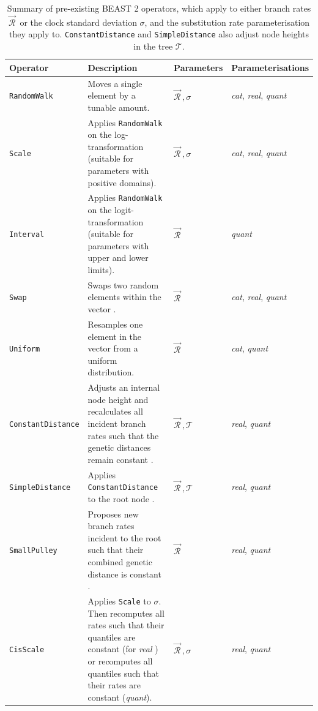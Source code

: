 \documentclass[10pt,letterpaper]{article}
\begin{document}
\begin{table}[h!]
\centering
\begin{tabular}{l p{4.2cm} l l} 
 Operator & Description & Parameters & Parameterisations  \\
  \hline
 \texttt{RandomWalk} & Moves a single element by a tunable amount. & $\vec{\mathcal{R}}^{\,}, \sigma$ & \textit{cat}, \textit{real}, \textit{quant} \\
  \hline
\texttt{Scale} & Applies \texttt{RandomWalk} on the log-transformation (suitable for parameters with positive domains). & $\vec{\mathcal{R}}^{\,}, \sigma$ & \textit{cat}, \textit{real}, \textit{quant}  \\
  \hline
 \texttt{Interval} & Applies \texttt{RandomWalk} on the logit-transformation (suitable for parameters with upper and lower limits). & $\vec{\mathcal{R}}^{\,}$ & \textit{quant}  \\
  \hline
 \texttt{Swap} & Swaps two random elements within the vector \cite{drummond2006relaxed}. & $\vec{\mathcal{R}}^{\,}$  & \textit{cat}, \textit{real}, \textit{quant}  \\
 \hline
\texttt{Uniform} & Resamples one element in the vector from a uniform distribution. & $\vec{\mathcal{R}}^{\,}$  & \textit{cat}, \textit{quant}  \\
 \hline
\texttt{ConstantDistance} & Adjusts an internal node height and recalculates all incident branch rates such that the genetic distances remain constant \cite{zhang2020improving}.  & $\vec{\mathcal{R}}^{\,}, \mathcal{T}$ & \textit{real}, \textit{quant} \\
 \hline
\texttt{SimpleDistance} & Applies \texttt{ConstantDistance} to the root node \cite{zhang2020improving}.  & $\vec{\mathcal{R}}^{\,}, \mathcal{T}$ & \textit{real}, \textit{quant} \\
 \hline
\texttt{SmallPulley} & Proposes new branch rates incident to the root such that their combined genetic distance is constant  \cite{zhang2020improving}.  & $\vec{\mathcal{R}}^{\,}$ & \textit{real}, \textit{quant} \\
 \hline
\texttt{CisScale} & Applies \texttt{Scale} to $\sigma$. Then recomputes all rates such that their quantiles are constant (for \textit{real} \cite{zhang2020improving}) or recomputes all quantiles such that their rates are constant (\textit{quant}).  & $\vec{\mathcal{R}}^{\,}, \sigma$ & \textit{real}, \textit{quant} \\
\end{tabular}
\caption{Summary of pre-existing BEAST 2 operators, which apply to either branch rates $\vec{\mathcal{R}}^{\,}$ or the clock standard deviation $\sigma$, and the substitution rate parameterisation they apply to.
 \texttt{ConstantDistance} and \texttt{SimpleDistance} also adjust node heights in the tree $\mathcal{T}$. }
\label{table:kernels}
\end{table}
\end{document}
